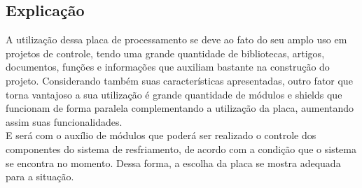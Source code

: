 \subsection{Explicação}
A utilização dessa placa de processamento se deve ao fato do seu amplo uso em projetos de controle, tendo uma grande quantidade de bibliotecas, artigos, documentos, funções e informações que auxiliam bastante na construção do projeto. Considerando também suas características apresentadas, outro fator que torna vantajoso a sua utilização é grande quantidade de módulos e shields que funcionam de forma paralela complementando a utilização da placa, aumentando assim suas funcionalidades. \\
E será com o auxílio de módulos que poderá ser realizado o controle dos componentes do sistema de resfriamento, de acordo com a condição que o sistema se encontra no momento. Dessa forma, a escolha da placa se mostra adequada para a situação.\\
